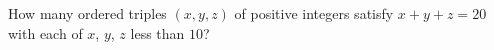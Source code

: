 How many ordered triples $(x,y,z)$ of positive integers satisfy $x+y+z=20$ with each of $x$, $y$, $z$ less than $10$?
